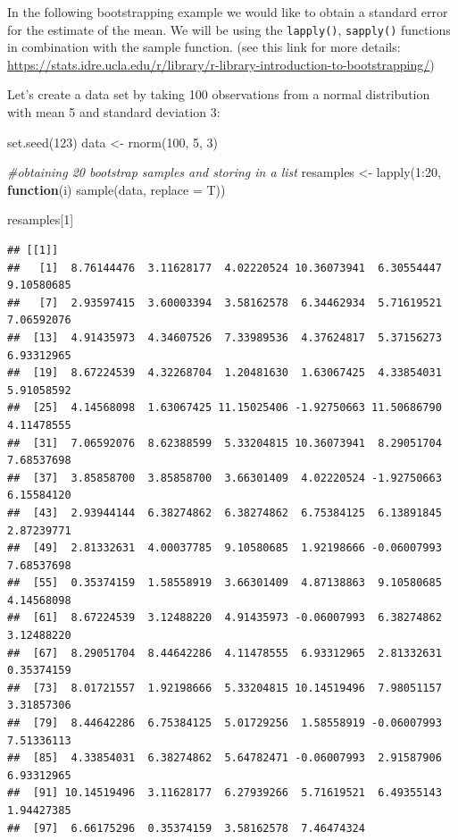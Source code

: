 \documentclass[
]{book}
\newenvironment{Shaded}{\begin{snugshade}}{\end{snugshade}}
\newcommand{\AttributeTok}[1]{\textcolor[rgb]{0.77,0.63,0.00}{#1}}
\newcommand{\CommentTok}[1]{\textcolor[rgb]{0.56,0.35,0.01}{\textit{#1}}}
\newcommand{\ControlFlowTok}[1]{\textcolor[rgb]{0.13,0.29,0.53}{\textbf{#1}}}
\newcommand{\DecValTok}[1]{\textcolor[rgb]{0.00,0.00,0.81}{#1}}
\newcommand{\FunctionTok}[1]{\textcolor[rgb]{0.00,0.00,0.00}{#1}}
\newcommand{\NormalTok}[1]{#1}
\newcommand{\OtherTok}[1]{\textcolor[rgb]{0.56,0.35,0.01}{#1}}
\newcommand{\SpecialCharTok}[1]{\textcolor[rgb]{0.00,0.00,0.00}{#1}}
\begin{document}
In the following bootstrapping example we would like to obtain a standard error for the estimate of the mean. We will be using the \texttt{lapply()}, \texttt{sapply()} functions in combination with the sample function. (see this link for more details: \url{https://stats.idre.ucla.edu/r/library/r-library-introduction-to-bootstrapping/})\citep{UCLA_2021}

Let's create a data set by taking 100 observations from a normal distribution with mean 5 and standard deviation 3:

\begin{Shaded}
\begin{Highlighting}[]
\FunctionTok{set.seed}\NormalTok{(}\DecValTok{123}\NormalTok{)}
\NormalTok{data }\OtherTok{\textless{}{-}} \FunctionTok{rnorm}\NormalTok{(}\DecValTok{100}\NormalTok{, }\DecValTok{5}\NormalTok{, }\DecValTok{3}\NormalTok{) }

\CommentTok{\#obtaining 20 bootstrap samples and storing in a list}
\NormalTok{resamples }\OtherTok{\textless{}{-}} \FunctionTok{lapply}\NormalTok{(}\DecValTok{1}\SpecialCharTok{:}\DecValTok{20}\NormalTok{, }\ControlFlowTok{function}\NormalTok{(i) }\FunctionTok{sample}\NormalTok{(data, }\AttributeTok{replace =}\NormalTok{ T))}

\NormalTok{resamples[}\DecValTok{1}\NormalTok{]}
\end{Highlighting}
\end{Shaded}

\begin{verbatim}
## [[1]]
##   [1]  8.76144476  3.11628177  4.02220524 10.36073941  6.30554447  9.10580685
##   [7]  2.93597415  3.60003394  3.58162578  6.34462934  5.71619521  7.06592076
##  [13]  4.91435973  4.34607526  7.33989536  4.37624817  5.37156273  6.93312965
##  [19]  8.67224539  4.32268704  1.20481630  1.63067425  4.33854031  5.91058592
##  [25]  4.14568098  1.63067425 11.15025406 -1.92750663 11.50686790  4.11478555
##  [31]  7.06592076  8.62388599  5.33204815 10.36073941  8.29051704  7.68537698
##  [37]  3.85858700  3.85858700  3.66301409  4.02220524 -1.92750663  6.15584120
##  [43]  2.93944144  6.38274862  6.38274862  6.75384125  6.13891845  2.87239771
##  [49]  2.81332631  4.00037785  9.10580685  1.92198666 -0.06007993  7.68537698
##  [55]  0.35374159  1.58558919  3.66301409  4.87138863  9.10580685  4.14568098
##  [61]  8.67224539  3.12488220  4.91435973 -0.06007993  6.38274862  3.12488220
##  [67]  8.29051704  8.44642286  4.11478555  6.93312965  2.81332631  0.35374159
##  [73]  8.01721557  1.92198666  5.33204815 10.14519496  7.98051157  3.31857306
##  [79]  8.44642286  6.75384125  5.01729256  1.58558919 -0.06007993  7.51336113
##  [85]  4.33854031  6.38274862  5.64782471 -0.06007993  2.91587906  6.93312965
##  [91] 10.14519496  3.11628177  6.27939266  5.71619521  6.49355143  1.94427385
##  [97]  6.66175296  0.35374159  3.58162578  7.46474324
\end{verbatim}
\end{document}
